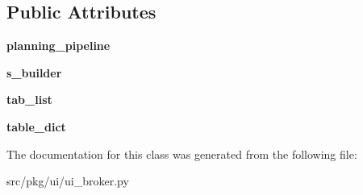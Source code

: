 \subsection*{Public Attributes}
\begin{DoxyCompactItemize}
\item 
\mbox{\label{classrnb-planning_1_1src_1_1pkg_1_1ui_1_1ui__broker_1_1_u_i_broker_ac5729c12bd49a0b7b371ad75fb11c668}} 
{\bfseries planning\+\_\+pipeline}
\item 
\mbox{\label{classrnb-planning_1_1src_1_1pkg_1_1ui_1_1ui__broker_1_1_u_i_broker_ac75ed899c8dc4832b975cde7c836699b}} 
{\bfseries s\+\_\+builder}
\item 
\mbox{\label{classrnb-planning_1_1src_1_1pkg_1_1ui_1_1ui__broker_1_1_u_i_broker_a3edfe969fe4c6b81c5e81494509ea43e}} 
{\bfseries tab\+\_\+list}
\item 
\mbox{\label{classrnb-planning_1_1src_1_1pkg_1_1ui_1_1ui__broker_1_1_u_i_broker_acb809cb8de94d1765a98c46cc3c70dcf}} 
{\bfseries table\+\_\+dict}
\end{DoxyCompactItemize}


The documentation for this class was generated from the following file\+:\begin{DoxyCompactItemize}
\item 
src/pkg/ui/ui\+\_\+broker.\+py\end{DoxyCompactItemize}
